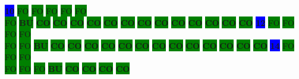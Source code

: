 \colorbox{blue}{\color[rgb]{1,0,0}\textbf{10}}%
\colorbox{green}{\color[gray]{0.75}FO}%
\colorbox{green}{\color[gray]{0.75}FO}%
\colorbox{green}{\color[gray]{0.75}FO}%
\colorbox{green}{\color[gray]{0.75}FO}%
\colorbox{green}{\color[gray]{0.75}FO}%
\\
\colorbox{green}{\color[gray]{0.75}FO}%
\colorbox{green}{\color[rgb]{1,0,0}\textbf{BU}}%
\colorbox{green}{\color[rgb]{0,0,0}\textbf{CO}}%
\colorbox{green}{\color[rgb]{0,0,0}\textbf{CO}}%
\colorbox{green}{\color[rgb]{0,0,0}\textbf{CO}}%
\colorbox{green}{\color[rgb]{0,0,0}\textbf{CO}}%
\colorbox{green}{\color[rgb]{0,0,0}\textbf{CO}}%
\colorbox{green}{\color[rgb]{0,0,0}\textbf{CO}}%
\colorbox{green}{\color[rgb]{0,0,0}\textbf{CO}}%
\colorbox{green}{\color[rgb]{0,0,0}\textbf{CO}}%
\colorbox{green}{\color[rgb]{0,0,0}\textbf{CO}}%
\colorbox{green}{\color[rgb]{0,0,0}\textbf{CO}}%
\colorbox{green}{\color[rgb]{0,0,0}\textbf{CO}}%
\colorbox{green}{\color[rgb]{0,0,0}\textbf{CO}}%
\colorbox{green}{\color[rgb]{0,0,0}\textbf{CO}}%
\colorbox{blue}{\color[rgb]{1,0,0}\textbf{12}}%
\colorbox{green}{\color[gray]{0.75}FO}%
\colorbox{green}{\color[gray]{0.75}FO}%
\colorbox{green}{\color[gray]{0.75}FO}%
\colorbox{green}{\color[gray]{0.75}FO}%
\\
\colorbox{green}{\color[gray]{0.75}FO}%
\colorbox{green}{\color[gray]{0.75}FO}%
\colorbox{green}{\color[rgb]{1,0,0}\textbf{BU}}%
\colorbox{green}{\color[rgb]{0,0,0}\textbf{CO}}%
\colorbox{green}{\color[rgb]{0,0,0}\textbf{CO}}%
\colorbox{green}{\color[rgb]{0,0,0}\textbf{CO}}%
\colorbox{green}{\color[rgb]{0,0,0}\textbf{CO}}%
\colorbox{green}{\color[rgb]{0,0,0}\textbf{CO}}%
\colorbox{green}{\color[rgb]{0,0,0}\textbf{CO}}%
\colorbox{green}{\color[rgb]{0,0,0}\textbf{CO}}%
\colorbox{green}{\color[rgb]{0,0,0}\textbf{CO}}%
\colorbox{green}{\color[rgb]{0,0,0}\textbf{CO}}%
\colorbox{green}{\color[rgb]{0,0,0}\textbf{CO}}%
\colorbox{green}{\color[rgb]{0,0,0}\textbf{CO}}%
\colorbox{green}{\color[rgb]{0,0,0}\textbf{CO}}%
\colorbox{green}{\color[rgb]{0,0,0}\textbf{CO}}%
\colorbox{blue}{\color[rgb]{1,0,0}\textbf{14}}%
\colorbox{green}{\color[gray]{0.75}FO}%
\colorbox{green}{\color[gray]{0.75}FO}%
\colorbox{green}{\color[gray]{0.75}FO}%
\\
\colorbox{green}{\color[gray]{0.75}FO}%
\colorbox{green}{\color[gray]{0.75}FO}%
\colorbox{green}{\color[gray]{0.75}FO}%
\colorbox{green}{\color[rgb]{1,0,0}\textbf{BU}}%
\colorbox{green}{\color[rgb]{0,0,0}\textbf{CO}}%
\colorbox{green}{\color[rgb]{0,0,0}\textbf{CO}}%
\colorbox{green}{\color[rgb]{0,0,0}\textbf{CO}}%
\colorbox{green}{\color[rgb]{0,0,0}\textbf{CO}}%
